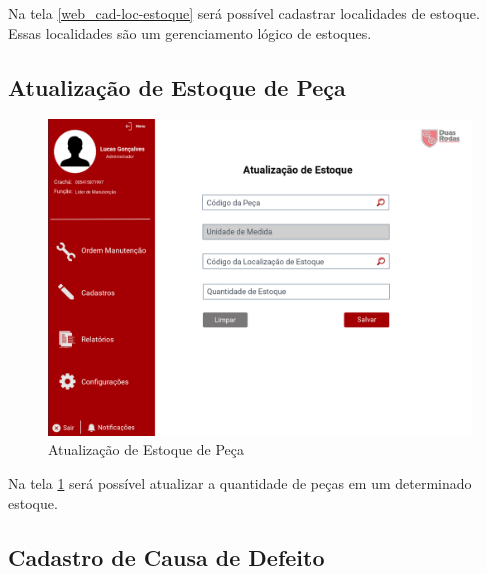Na tela \ref{web_cad-loc-estoque} será possível cadastrar localidades de estoque. Essas localidades são um gerenciamento lógico de estoques.

\newpage
\subsection{Atualização de Estoque de Peça}

\begin{figure}[htb]
	\caption{\label{web_est-estoque}Atualização de Estoque de Peça}
	\begin{center}
		\includegraphics[scale=0.55]{./Figuras/web/est-estoque.png}
	\end{center}
\end{figure}

Na tela \ref{web_est-estoque} será possível atualizar a quantidade de peças em um determinado estoque.

\newpage
\subsection{Cadastro de Causa de Defeito}

